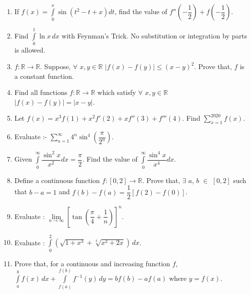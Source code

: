 \documentclass[11pt, a4paper]{article}
\begin{document}
\begin{enumerate}

	\item If $\displaystyle{f(x) = \int \limits_{0}^{x} \sin \left( t^2 - t + x \right) dt}$, find the value of $f''\left( - \dfrac{1}{2} \right) + f \left( - \dfrac{1}{2} \right)$.
	
	\item Find $\displaystyle{\int \limits_{0}^{1} \ln x} \, dx $ with Feynman's Trick. No substitution or integration by parts is allowed.
	
	\item $f : \mathbb{R} \rightarrow \mathbb{R}$. Suppose, $\forall$ $x, y \in \mathbb{R}$ $| f(x) - f(y) | \leq (x-y)^2$. Prove that, $f$ is a constant function.
	
	\item Find all functions $f : \mathbb{R} \rightarrow \mathbb{R}$ which satisfy $\forall$ $x, y \in \mathbb{R}$ $| f(x) - f(y) | = |x-y|$.
	
	\item Let $f(x) = x^3 f(1) + x^2 f'(2) + xf''(3) + f'''(4)$. Find $\sum \limits_{x = 1}^{2020} f(x)$.
	
	\item Evaluate :- $\sum \limits_{n = 1}^{\infty} 4^n \sin^4 \left( \dfrac{\pi}{2^n} \right)$.
	
	\item Given $\displaystyle{\int \limits_{0}^{\infty} \dfrac{\sin^2 x}{x^2} dx = \dfrac{\pi}{2}}$. Find the value of $\displaystyle{\int \limits_{0}^{\infty} \dfrac{\sin^4 x}{x^4} dx}$.
	
	\item Define a continuous function $f:[0,2] \rightarrow \mathbb{R}$. Prove that, $\exists$ $a$, $b$ $\in$ $[0,2]$ such that $b-a = 1$ and $f(b) - f(a) = \dfrac{1}{2}[f(2) - f(0)]$.
	
	\item Evaluate : $\lim \limits_{n \rightarrow \infty} \left[ \tan \left( \dfrac{\pi}{4} + \dfrac{1}{n} \right) \right]^n$.
	
	\item Evaluate : $\displaystyle{\int \limits_{0}^{2}} \left( \sqrt{1+x^3} + \sqrt[3]{x^2 + 2x} \right) \, dx$.
	
	\item Prove that, for a continuous and increasing function $f$, $\displaystyle{\int \limits_{a}^{b} f(x) \, dx + \int \limits_{f(a)}^{f(b)} f^{-1}(y) \, dy = bf(b)- af(a)}$ where $y = f(x)$.
	

\end{enumerate}
\end{document}
